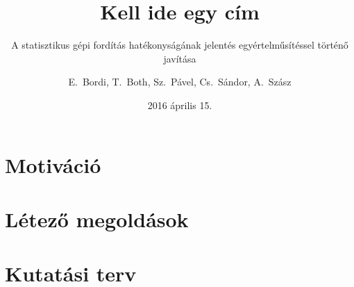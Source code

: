 \documentclass{beamer}
\title{Kell ide egy cím}
\subtitle{A statisztikus gépi fordítás hatékonyságának jelentés egyértelműsítéssel történő javítása}
\author{E.~Bordi, T.~Both, Sz.~Pável, Cs.~Sándor, A.~Szász}
\institute[Babe\c{s}-Bolyai Tudományegyetem] %
{Babe\c{s}-Bolyai Tudományegyetem, Matematika és Informatika Kar, Kolozsvár}
\date{2016 április 15.}
\begin{document}


\section{Motiváció}


\section{Létező megoldások}


\section{Kutatási terv}




\end{document}
